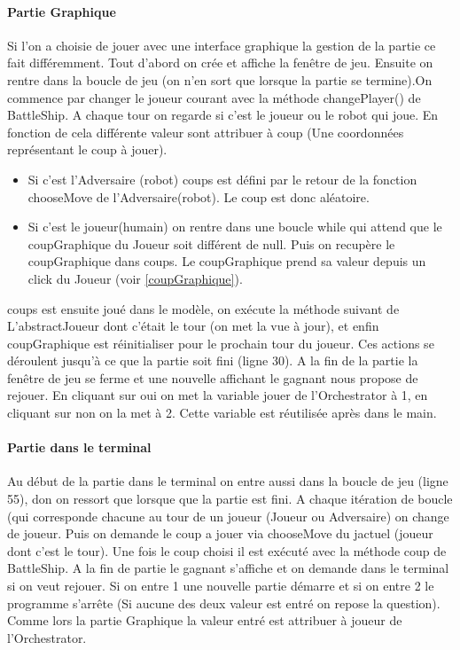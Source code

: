 \documentclass[a4paper,12pt]{article} %
\begin{document}
\paragraph{Partie Graphique}Si l'on a choisie de jouer avec une interface graphique la gestion de la partie ce fait différemment. Tout d’abord on crée et affiche la fenêtre de jeu. Ensuite on rentre dans la boucle de jeu (on n'en sort que lorsque la partie se termine).On commence par changer le joueur courant avec la méthode changePlayer() de BattleShip. A chaque tour on regarde si c'est le joueur ou le robot qui joue. En fonction de cela différente valeur sont attribuer à coup (Une coordonnées représentant le coup à jouer).
\begin{itemize}
\item Si c'est l'Adversaire (robot) coups est défini par le retour de la fonction chooseMove de l'Adversaire(robot). Le coup est donc aléatoire.
\item Si c'est le joueur(humain) on rentre dans une boucle while qui attend que le coupGraphique du Joueur soit différent de null. Puis on recupère le coupGraphique dans coups. Le coupGraphique prend sa valeur depuis un click du Joueur (voir \ref{coupGraphique}).
\end{itemize}
coups est ensuite joué dans le modèle, on exécute la méthode suivant de L'abstractJoueur dont c'était le tour (on met la vue à jour), et enfin coupGraphique est réinitialiser pour le prochain tour du joueur. Ces actions se déroulent jusqu’à ce que la partie soit fini (ligne 30). A la fin de la partie la fenêtre de jeu se ferme et une nouvelle affichant le gagnant nous propose de rejouer.
En cliquant sur oui on met la variable jouer de l'Orchestrator à 1, en cliquant sur non on la met à 2. Cette variable est réutilisée après dans le main. 
\paragraph{Partie dans le terminal}
Au début de la partie dans le terminal on entre aussi dans la boucle de jeu (ligne 55), don on ressort que lorsque que la partie est fini. A chaque itération de boucle (qui corresponde chacune au tour de un joueur (Joueur ou Adversaire) on change de joueur. Puis on demande le coup a jouer via chooseMove du jactuel (joueur dont c'est le tour). Une fois le coup choisi il est exécuté avec la méthode coup de BattleShip. A la fin de partie le gagnant s'affiche et on demande dans le terminal si on veut rejouer. Si on entre 1 une nouvelle partie démarre et si on entre 2 le programme s'arrête (Si aucune des deux valeur est entré on repose la question). Comme lors la partie Graphique la valeur entré est attribuer à joueur de l'Orchestrator.
\end{document}
